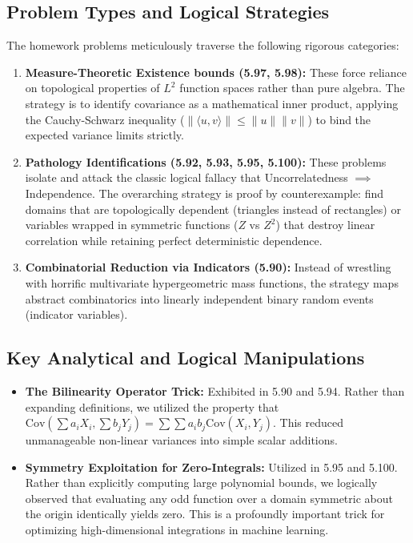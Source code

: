 \documentclass[11pt, a4paper]{article}
\theoremstyle{definition}
\theoremstyle{remark}
\newcommand{\Cov}{\mathrm{Cov}}
\begin{document}
\subsection{Problem Types and Logical Strategies}
The homework problems meticulously traverse the following rigorous categories:
\begin{enumerate}
    \item \textbf{Measure-Theoretic Existence bounds (5.97, 5.98):} These force reliance on topological properties of $L^2$ function spaces rather than pure algebra. The strategy is to identify covariance as a mathematical inner product, applying the Cauchy-Schwarz inequality ($\| \langle u, v \rangle \| \le \|u\|\|v\|$) to bind the expected variance limits strictly.
    \item \textbf{Pathology Identifications (5.92, 5.93, 5.95, 5.100):} These problems isolate and attack the classic logical fallacy that Uncorrelatedness $\implies$ Independence. The overarching strategy is proof by counterexample: find domains that are topologically dependent (triangles instead of rectangles) or variables wrapped in symmetric functions ($Z$ vs $Z^2$) that destroy linear correlation while retaining perfect deterministic dependence.
    \item \textbf{Combinatorial Reduction via Indicators (5.90):} Instead of wrestling with horrific multivariate hypergeometric mass functions, the strategy maps abstract combinatorics into linearly independent binary random events (indicator variables). 
\end{enumerate}

\subsection{Key Analytical and Logical Manipulations}
\begin{itemize}
    \item \textbf{The Bilinearity Operator Trick:} Exhibited in 5.90 and 5.94. Rather than expanding definitions, we utilized the property that $\Cov\left(\sum a_i X_i, \sum b_j Y_j\right) = \sum \sum a_i b_j \Cov(X_i, Y_j)$. This reduced unmanageable non-linear variances into simple scalar additions.
    \item \textbf{Symmetry Exploitation for Zero-Integrals:} Utilized in 5.95 and 5.100. Rather than explicitly computing large polynomial bounds, we logically observed that evaluating any odd function over a domain symmetric about the origin identically yields zero. This is a profoundly important trick for optimizing high-dimensional integrations in machine learning.
\end{itemize}
\end{document}
